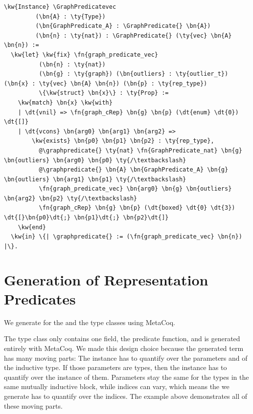 \label{code:GraphPredicatevec}
\newcommand{\GraphPredicatevec}{\hyperref[code:GraphPredicatevec]{\fn{GraphPredicate\_\linebreak[0]vec}}}
\begin{Verbatim}
\kw{Instance} \GraphPredicatevec
         (\bn{A} : \ty{Type}) 
         (\bn{GraphPredicate_A} : \GraphPredicate{} \bn{A})
         (\bn{n} : \ty{nat}) : \GraphPredicate{} (\ty{vec} \bn{A} \bn{n}) :=
  \kw{let} \kw{fix} \fn{graph_predicate_vec} 
          (\bn{n} : \ty{nat})
          (\bn{g} : \ty{graph}) (\bn{outliers} : \ty{outlier_t}) (\bn{x} : \ty{vec} \bn{A} \bn{n}) (\bn{p} : \ty{rep_type})
          \{\kw{struct} \bn{x}\} : \ty{Prop} :=
    \kw{match} \bn{x} \kw{with}
    | \dt{vnil} => \fn{graph_cRep} \bn{g} \bn{p} (\dt{enum} \dt{0}) \dt{[]}
    | \dt{vcons} \bn{arg0} \bn{arg1} \bn{arg2} =>
        \kw{exists} \bn{p0} \bn{p1} \bn{p2} : \ty{rep_type},
          @\graphpredicate{} \ty{nat} \fn{GraphPredicate_nat} \bn{g} \bn{outliers} \bn{arg0} \bn{p0} \ty{/\textbackslash}
          @\graphpredicate{} \bn{A} \bn{GraphPredicate_A} \bn{g} \bn{outliers} \bn{arg1} \bn{p1} \ty{/\textbackslash}
          \fn{graph_predicate_vec} \bn{arg0} \bn{g} \bn{outliers} \bn{arg2} \bn{p2} \ty{/\textbackslash}
          \fn{graph_cRep} \bn{g} \bn{p} (\dt{boxed} \dt{0} \dt{3}) \dt{[}\bn{p0}\dt{;} \bn{p1}\dt{;} \bn{p2}\dt{]}
    \kw{end}
  \kw{in} \{| \graphpredicate{} := (\fn{graph_predicate_vec} \bn{n}) |\}.
\end{Verbatim}


\section{Generation of Representation Predicates}
\label{predicategen}

We generate for the \GraphPredicate{} and the \InGraph{} type classes using MetaCoq.

The \GraphPredicate{} type class only contains one field, the predicate function, and is generated entirely with MetaCoq. We made this design choice because the generated term has many moving parts: The instance has to quantify over the \gls{parameter}s and \indices{} of the inductive type. If those parameters are types, then the instance has to quantify over the \GraphPredicate{} instance of them. Parameters stay the same for the types in the same mutually inductive block, while indices can vary, which means the  we generate has to quantify over the indices. The \GraphPredicatevec{} example above demonstrates all of these moving parts.

